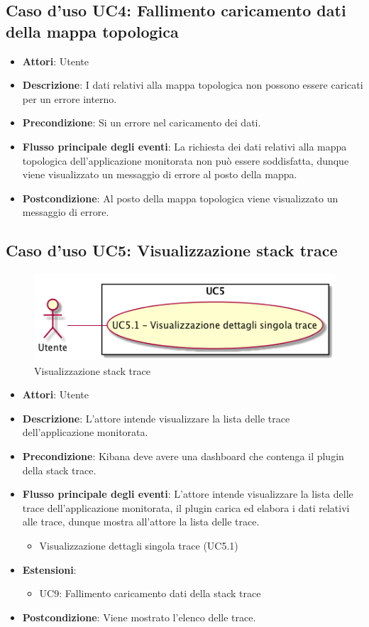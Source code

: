  \hypertarget{UC4}{}
\subsection{Caso d'uso UC4: Fallimento caricamento dati della mappa topologica}
\begin{itemize}
	\item \textbf{Attori}: Utente
	\item \textbf{Descrizione}: I dati relativi alla mappa topologica non possono essere caricati per un errore interno.
	\item \textbf{Precondizione}: Si  un errore nel caricamento dei dati.
	\item \textbf{Flusso principale degli eventi}: La richiesta dei dati relativi alla mappa topologica dell'applicazione monitorata non può essere soddisfatta, dunque viene visualizzato un messaggio di errore al posto della mappa.
	\item \textbf{Postcondizione}: Al posto della mappa topologica viene visualizzato un messaggio di errore.
\end{itemize}

 \hypertarget{UC5}{}
\subsection{Caso d'uso UC5: Visualizzazione stack trace}
\begin{figure} [H]
	\centering
	\includegraphics[scale=0.45]{./UC/UC5.png}
	\caption{Visualizzazione stack trace}\label{}
\end{figure}
\begin{itemize}
	\item \textbf{Attori}: Utente
	\item \textbf{Descrizione}: L'attore intende visualizzare la lista delle trace dell'applicazione monitorata.
	\item \textbf{Precondizione}: Kibana deve avere una dashboard che contenga il plugin della stack trace.
	\item \textbf{Flusso principale degli eventi}: L'attore intende visualizzare la lista delle trace dell'applicazione monitorata, il plugin carica ed elabora i dati relativi alle trace, dunque mostra all'attore la lista delle trace.
	\begin{itemize}
		\item Visualizzazione dettagli singola trace (UC5.1)
	\end{itemize}
	\item 	\textbf{Estensioni}:
	\begin{itemize}
		\item UC9: Fallimento caricamento dati della stack trace
	\end{itemize}
	\item \textbf{Postcondizione}: Viene mostrato l'elenco delle trace.
\end{itemize}

